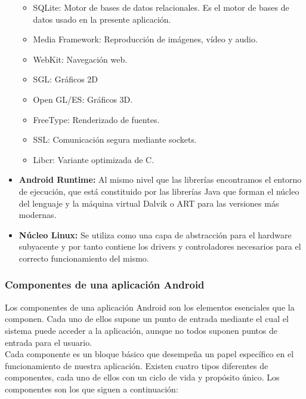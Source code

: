\begin{itemize}
\begin{itemize}
\item SQLite: Motor de bases de datos relacionales. Es el motor de bases de datos usado en la presente aplicación.
\item Media Framework: Reproducción de imágenes, vídeo y audio.
\item WebKit: Navegación web.
\item SGL: Gráficos 2D
\item Open GL/ES: Gráficos 3D.
\item FreeType: Renderizado de fuentes.
\item SSL: Comunicación segura mediante sockets.
\item Libcr: Variante optimizada de C.
\end{itemize}
\item \textbf{Android Runtime:} Al mismo nivel que las librerías encontramos el entorno de ejecución, que está constituido por las librerías Java que forman el núcleo del lenguaje y la máquina virtual Dalvik o ART para las versiones más modernas.
\item \textbf{Núcleo Linux:} Se utiliza como una capa de abstracción para el hardware subyacente y por tanto contiene los drivers y controladores necesarios para el correcto funcionamiento del mismo.
\end{itemize}

\subsubsection{Componentes de una aplicación Android}

Los componentes de una aplicación Android son los elementos esenciales que la componen. Cada uno de ellos supone un punto de entrada mediante el cual el sistema puede acceder a la aplicación, aunque no todos suponen puntos de entrada para el usuario.\\

Cada componente es un bloque básico que desempeña un papel específico en el funcionamiento de nuestra aplicación. Existen cuatro tipos diferentes de componentes, cada uno de ellos con un ciclo de vida y propósito único. Los componentes son los que siguen a continuación:


